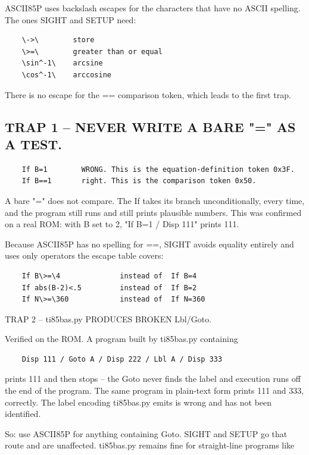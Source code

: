 \documentclass[11pt]{article}
\begin{document}
ASCII85P uses backslash escapes for the characters that have no ASCII spelling. The ones SIGHT and SETUP need:

\begin{verbatim}
    \->\        store
    \>=\        greater than or equal
    \sin^-1\    arcsine
    \cos^-1\    arccosine
\end{verbatim}

There is no escape for the == comparison token, which leads to the first trap.

\subsection*{TRAP 1 -- NEVER WRITE A BARE "=" AS A TEST.}

\begin{verbatim}
    If B=1        WRONG. This is the equation-definition token 0x3F.
    If B==1       right. This is the comparison token 0x50.
\end{verbatim}

A bare "=" does not compare. The If takes its branch unconditionally, every time, and the program still runs and still prints plausible numbers. This was confirmed on a real ROM: with B set to 2, "If B=1 / Disp 111" prints 111.

Because ASCII85P has no spelling for ==, SIGHT avoids equality entirely and uses only operators the escape table covers:

\begin{verbatim}
    If B\>=\4              instead of  If B=4
    If abs(B-2)<.5         instead of  If B=2
    If N\>=\360            instead of  If N=360
\end{verbatim}

TRAP 2 -- ti85bas.py PRODUCES BROKEN Lbl/Goto.

Verified on the ROM. A program built by ti85bas.py containing

\begin{verbatim}
    Disp 111 / Goto A / Disp 222 / Lbl A / Disp 333
\end{verbatim}

prints 111 and then stops -- the Goto never finds the label and execution runs off the end of the program. The same program in plain-text form prints 111 and 333, correctly. The label encoding ti85bas.py emits is wrong and has not been identified.

So: use ASCII85P for anything containing Goto. SIGHT and SETUP go that route and are unaffected. ti85bas.py remains fine for straight-line programs like
\end{document}
